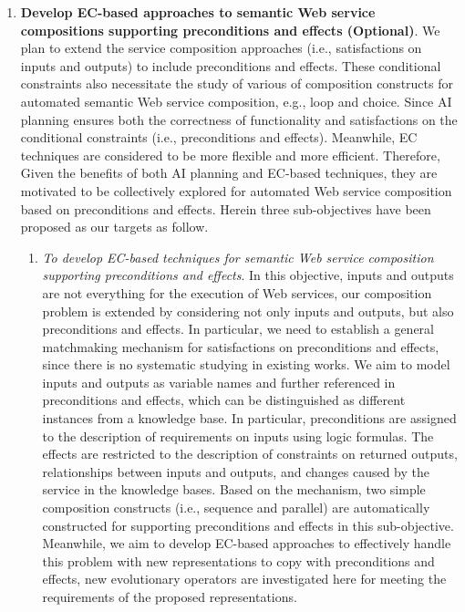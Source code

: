 \begin{enumerate}
 \item \textbf{Develop EC-based approaches to semantic Web service compositions supporting preconditions and effects (Optional)}. We plan to extend the service composition approaches (i.e., satisfactions on inputs and outputs) to include preconditions and effects. These conditional constraints also necessitate the study of various of composition constructs for automated semantic Web service composition, e.g., loop and choice. Since AI planning ensures both the correctness of functionality and satisfactions on the conditional constraints (i.e., preconditions and effects). Meanwhile, EC techniques are considered to be more flexible and more efficient. Therefore, Given the benefits of both AI planning and EC-based techniques, they are motivated to be collectively explored for automated Web service composition based on preconditions and effects. Herein three sub-objectives have been proposed as our targets as follow.
 
 \begin{enumerate}
 
  \item \emph{To develop EC-based techniques for semantic Web service composition supporting preconditions and effects}. In this objective, inputs and outputs are not everything for the execution of Web services, our composition problem is extended by considering not only inputs and outputs, but also preconditions and effects. In particular, we need to establish a general matchmaking mechanism for satisfactions on preconditions and effects, since there is no systematic studying in existing works. We aim to model inputs and outputs as variable names and further referenced in preconditions and effects, which can be distinguished as different instances from a knowledge base. In particular, preconditions are assigned to the description of requirements on inputs using logic formulas. The effects are restricted to the description of constraints on returned outputs, relationships between inputs and outputs, and changes caused by the service in the knowledge bases. Based on the mechanism, two simple composition constructs (i.e., sequence and parallel) are automatically constructed for supporting preconditions and effects in this sub-objective. Meanwhile, we aim to develop EC-based approaches to effectively handle this problem with new representations to copy with preconditions and effects, new evolutionary operators are investigated here for meeting the requirements of the proposed representations.


\end{enumerate}
\end{enumerate}
